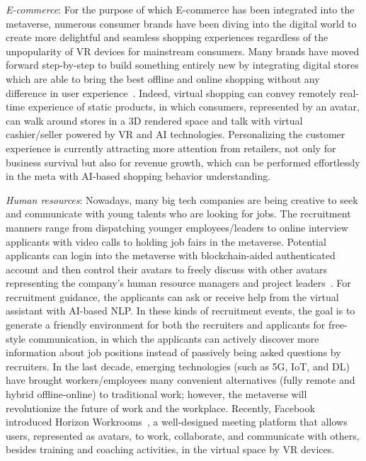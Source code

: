 \documentclass[journal]{IEEEtran}
\begin{document}
\textit{E-commerce}:
For the purpose of which E-commerce has been integrated into the metaverse, numerous consumer brands have been diving into the digital world to create more delightful and seamless shopping experiences regardless of the unpopularity of VR devices for mainstream consumers. 
Many brands have moved forward step-by-step to build something entirely new by integrating digital stores which are able to bring the best offline and online shopping without any difference in user experience~\cite{elisabeth2021look}.
Indeed, virtual shopping can convey remotely real-time experience of static products, in which consumers, represented by an avatar, can walk around stores in a 3D rendered space and talk with virtual cashier/seller powered by VR and AI technologies.
Personalizing the customer experience is currently attracting more attention from retailers, not only for business survival but also for revenue growth, which can be performed effortlessly in the meta with AI-based shopping behavior understanding.

\textit{Human resources}:
Nowadays, many big tech companies are being creative to seek and communicate with young talents who are looking for jobs. The recruitment manners range from dispatching younger employees/leaders to online interview applicants with video calls to holding job fairs in the metaverse.
Potential applicants can login into the metaverse with blockchain-aided authenticated account and then control their avatars to freely discuss with other avatars representing the company’s human resource managers and project leaders~\cite{lucy2021looking}. For recruitment guidance, the applicants can ask or receive help from the virtual assistant with AI-based NLP. 
In these kinds of recruitment events, the goal is to generate a friendly environment for both the recruiters and applicants for free-style communication, in which the applicants can actively discover more information about job positions instead of passively being asked questions by recruiters.
In the last decade, emerging technologies (such as 5G, IoT, and DL) have brought workers/employees many convenient alternatives (fully remote and hybrid offline-online) to traditional work; however, the metaverse will revolutionize the future of work and the workplace. Recently, Facebook introduced Horizon Workrooms~\cite{Meta2021}, a well-designed meeting platform that allows users, represented as avatars, to work, collaborate, and communicate with others, besides training and coaching activities, in the virtual space by VR devices.
\end{document}
